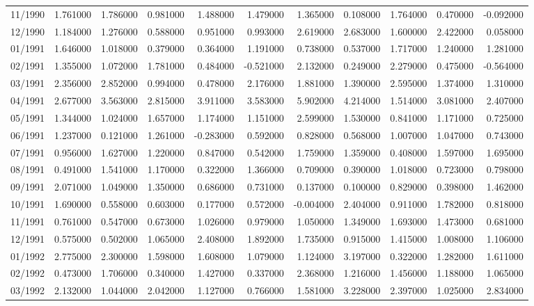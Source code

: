 \begin{tabular}{lrrrrrrrrrr}
11/1990 & 1.761000 & 1.786000 & 0.981000 & 1.488000 & 1.479000 & 1.365000 & 0.108000 & 1.764000 & 0.470000 & -0.092000 \\
12/1990 & 1.184000 & 1.276000 & 0.588000 & 0.951000 & 0.993000 & 2.619000 & 2.683000 & 1.600000 & 2.422000 & 0.058000 \\
01/1991 & 1.646000 & 1.018000 & 0.379000 & 0.364000 & 1.191000 & 0.738000 & 0.537000 & 1.717000 & 1.240000 & 1.281000 \\
02/1991 & 1.355000 & 1.072000 & 1.781000 & 0.484000 & -0.521000 & 2.132000 & 0.249000 & 2.279000 & 0.475000 & -0.564000 \\
03/1991 & 2.356000 & 2.852000 & 0.994000 & 0.478000 & 2.176000 & 1.881000 & 1.390000 & 2.595000 & 1.374000 & 1.310000 \\
04/1991 & 2.677000 & 3.563000 & 2.815000 & 3.911000 & 3.583000 & 5.902000 & 4.214000 & 1.514000 & 3.081000 & 2.407000 \\
05/1991 & 1.344000 & 1.024000 & 1.657000 & 1.174000 & 1.151000 & 2.599000 & 1.530000 & 0.841000 & 1.171000 & 0.725000 \\
06/1991 & 1.237000 & 0.121000 & 1.261000 & -0.283000 & 0.592000 & 0.828000 & 0.568000 & 1.007000 & 1.047000 & 0.743000 \\
07/1991 & 0.956000 & 1.627000 & 1.220000 & 0.847000 & 0.542000 & 1.759000 & 1.359000 & 0.408000 & 1.597000 & 1.695000 \\
08/1991 & 0.491000 & 1.541000 & 1.170000 & 0.322000 & 1.366000 & 0.709000 & 0.390000 & 1.018000 & 0.723000 & 0.798000 \\
09/1991 & 2.071000 & 1.049000 & 1.350000 & 0.686000 & 0.731000 & 0.137000 & 0.100000 & 0.829000 & 0.398000 & 1.462000 \\
10/1991 & 1.690000 & 0.558000 & 0.603000 & 0.177000 & 0.572000 & -0.004000 & 2.404000 & 0.911000 & 1.782000 & 0.818000 \\
11/1991 & 0.761000 & 0.547000 & 0.673000 & 1.026000 & 0.979000 & 1.050000 & 1.349000 & 1.693000 & 1.473000 & 0.681000 \\
12/1991 & 0.575000 & 0.502000 & 1.065000 & 2.408000 & 1.892000 & 1.735000 & 0.915000 & 1.415000 & 1.008000 & 1.106000 \\
01/1992 & 2.775000 & 2.300000 & 1.598000 & 1.608000 & 1.079000 & 1.124000 & 3.197000 & 0.322000 & 1.282000 & 1.611000 \\
02/1992 & 0.473000 & 1.706000 & 0.340000 & 1.427000 & 0.337000 & 2.368000 & 1.216000 & 1.456000 & 1.188000 & 1.065000 \\
03/1992 & 2.132000 & 1.044000 & 2.042000 & 1.127000 & 0.766000 & 1.581000 & 3.228000 & 2.397000 & 1.025000 & 2.834000 \\

\end{tabular}
